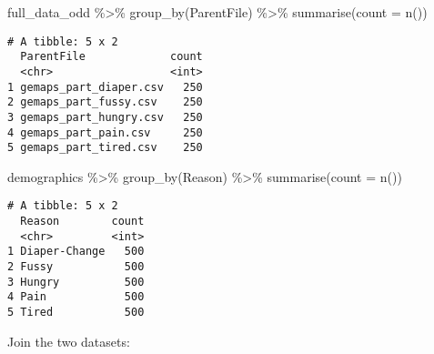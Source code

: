 \documentclass[
  letterpaper,
  DIV=11,
  numbers=noendperiod]{scrartcl}
\newenvironment{Shaded}{\begin{snugshade}}{\end{snugshade}}
\newcommand{\AttributeTok}[1]{\textcolor[rgb]{0.40,0.45,0.13}{#1}}
\newcommand{\FunctionTok}[1]{\textcolor[rgb]{0.28,0.35,0.67}{#1}}
\newcommand{\NormalTok}[1]{\textcolor[rgb]{0.00,0.23,0.31}{#1}}
\newcommand{\SpecialCharTok}[1]{\textcolor[rgb]{0.37,0.37,0.37}{#1}}
\begin{document}
\begin{Shaded}
\begin{Highlighting}[]
\NormalTok{full\_data\_odd }\SpecialCharTok{\%\textgreater{}\%}
  \FunctionTok{group\_by}\NormalTok{(ParentFile) }\SpecialCharTok{\%\textgreater{}\%}
  \FunctionTok{summarise}\NormalTok{(}\AttributeTok{count =} \FunctionTok{n}\NormalTok{())}
\end{Highlighting}
\end{Shaded}

\begin{verbatim}
# A tibble: 5 x 2
  ParentFile             count
  <chr>                  <int>
1 gemaps_part_diaper.csv   250
2 gemaps_part_fussy.csv    250
3 gemaps_part_hungry.csv   250
4 gemaps_part_pain.csv     250
5 gemaps_part_tired.csv    250
\end{verbatim}

\begin{Shaded}
\begin{Highlighting}[]
\NormalTok{demographics }\SpecialCharTok{\%\textgreater{}\%}
  \FunctionTok{group\_by}\NormalTok{(Reason) }\SpecialCharTok{\%\textgreater{}\%}
  \FunctionTok{summarise}\NormalTok{(}\AttributeTok{count =} \FunctionTok{n}\NormalTok{())}
\end{Highlighting}
\end{Shaded}

\begin{verbatim}
# A tibble: 5 x 2
  Reason        count
  <chr>         <int>
1 Diaper-Change   500
2 Fussy           500
3 Hungry          500
4 Pain            500
5 Tired           500
\end{verbatim}

Join the two datasets:
\end{document}
